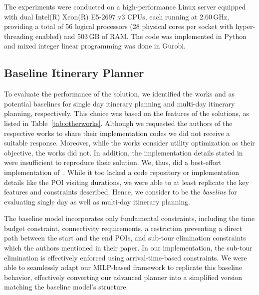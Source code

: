 The experiments were conducted on a high-performance Linux server equipped with dual Intel(R) Xeon(R) E5-2697 v3 CPUs, each running at 2.60\,GHz, providing a total of 56 logical processors (28 physical cores per socket with hyper-threading enabled) and 503\,GB of RAM.
The code was implemented in Python and mixed integer linear programming was done in Gurobi.

\subsection{Baseline Itinerary Planner}

To evaluate the performance of the \trip solution, we identified the works \cite{bolzoni2014efficient,taylor2018tour} and \cite{chen2014automatic,vanzelst2016itinerary} as potential baselines for single day itinerary planning and multi-day itinerary planning, respectively. This choice was based on the features of the solutions, as listed in Table~\ref{tab:otherworks}. Although we requested the authors of the respective works to share their implementation codes we did not receive a suitable response. Moreover, while the works \cite{bolzoni2014efficient,taylor2018tour}  consider utility optimization as their objective, the works \cite{chen2014automatic,vanzelst2016itinerary} did not. In addition, the implementation details stated in \cite{bolzoni2014efficient} were insufficient to reproduce their solution.  We, thus, did a best-effort implementation of~\cite{taylor2018tour}. While it too lacked a code repository or implementation details like the POI visiting durations, we were able to at least replicate the key features and constraints described. 
Hence, we consider \cite{taylor2018tour} to be the  \emph{baseline} for evaluating single day as well as multi-day itinerary planning.


The baseline model incorporates only fundamental constraints, including the time budget constraint, connectivity requirements, a restriction preventing a direct path between the start and the end POIs, and sub-tour elimination constraints which the authors mentioned in their paper. In our implementation, the sub-tour elimination is effectively enforced using arrival-time-based constraints. We were able to seamlessly adapt our MILP-based framework to replicate this baseline behavior, effectively converting our advanced planner into a simplified version matching the baseline model's structure.

